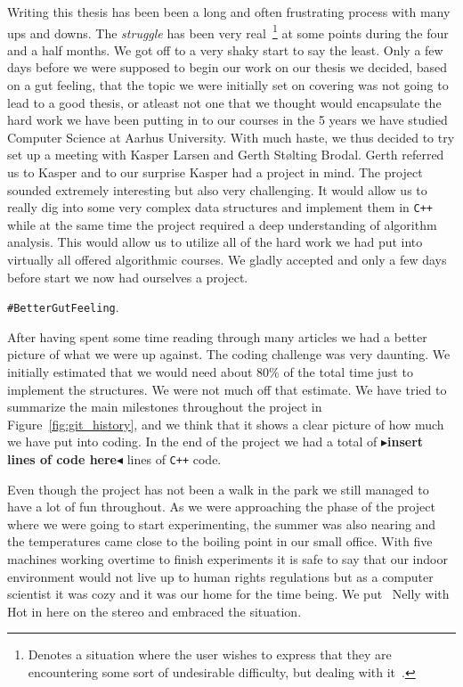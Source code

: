 \documentclass[twoside,11pt,openright]{report}
\newcommand{\todo}[1]{{\color[rgb]{.5,0,0}\textbf{$\blacktriangleright$#1$\blacktriangleleft$}}}
\begin{document}
Writing this thesis has been been a long and often frustrating process with many ups and downs. The \textit{struggle} has been very real~\footnote{Denotes a situation where the user wishes to express that they are encountering some sort of undesirable difficulty, but dealing with it~\cite{real_struggle}.} at some points during the four and a half months. We got off to a very shaky start to say the least. Only a few days before we were supposed to begin our work on our thesis we decided, based on a gut feeling, that the topic we were initially set on covering was not going to lead to a good thesis, or atleast not one that we thought would encapsulate the hard work we have been putting in to our courses in the 5 years we have studied Computer Science at Aarhus University. With much haste, we thus decided to try set up a meeting with Kasper Larsen and Gerth St\o lting Brodal. Gerth referred us to Kasper and to our surprise Kasper had a project in mind. The project sounded extremely interesting but also very challenging. It would allow us to really dig into some very complex data structures and implement them in \texttt{C++} while at the same time the project required a deep understanding of algorithm analysis. This would allow us to utilize all of the hard work we had put into virtually all offered algorithmic courses. We gladly accepted and only a few days before start we now had ourselves a project.
\begin{center}
\texttt{\#BetterGutFeeling}.
\end{center}
After having spent some time reading through many articles we had a better picture of what we were up against. The coding challenge was very daunting. We initially estimated that we would need about 80\% of the total time just to implement the structures. We were not much off that estimate. We have tried to summarize the main milestones throughout the project in Figure~\ref{fig:git_history}, and we think that it shows a clear picture of how much we have put into coding. In the end of the project we had a total of \todo{insert lines of code here} lines of \texttt{C++} code.

Even though the project has not been a walk in the park we still managed to have a lot of fun throughout. As we were approaching the phase of the project where we were going to start experimenting, the summer was also nearing and the temperatures came close to the boiling point in our small office. With five machines working overtime to finish experiments it is safe to say that our indoor environment would not live up to human rights regulations but as a computer scientist it was cozy and it was our home for the time being. We put \twonotes~Nelly with Hot in here  on the stereo and embraced the situation.
\end{document}
